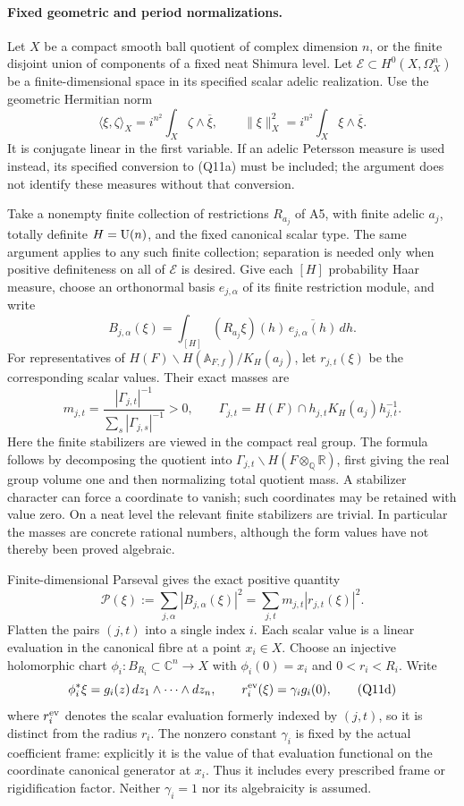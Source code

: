 \documentclass[11pt]{article}
\newcommand{\Q}{\mathbb Q}\newcommand{\C}{\mathbb C}\newcommand{\Z}{\mathbb Z}\newcommand{\R}{\mathbb R}\newcommand{\A}{\mathbb A}\newcommand{\OO}{\mathcal O}
\theoremstyle{definition}\newtheorem{definition}[theorem]{Definition}\newtheorem{remark}[theorem]{Remark}
\begin{document}
\paragraph{Fixed geometric and period normalizations.}
Let $X$ be a compact smooth ball quotient of complex dimension
$n$, or the finite disjoint union of components of a fixed neat
Shimura level.  Let $\mathcal E\subset H^0(X,\Omega_X^n)$ be a
finite-dimensional space in its specified scalar adelic
realization.  Use the geometric Hermitian norm
\[
 \langle\xi,\zeta\rangle_X
       =i^{n^2}\int_X\zeta\wedge\overline\xi,
 \qquad \|\xi\|_X^2=i^{n^2}\int_X\xi\wedge\overline\xi.
 \tag{Q11a}
\]
It is conjugate linear in the first variable.  If an adelic
Petersson measure is used instead, its specified conversion to
(Q11a) must be included; the argument does not identify these
measures without that conversion.

Take a nonempty finite collection of restrictions $R_{a_j}$ of A5, with finite adelic
$a_j$, totally definite $H=\operatorname{U}(n)$, and the fixed canonical
scalar type.  The same argument applies to any such finite
collection; separation is needed only when positive definiteness
on all of $\mathcal E$ is desired.  Give each $[H]$ probability
Haar measure, choose an orthonormal basis $e_{j,\alpha}$ of its
finite restriction module, and write
\[
 B_{j,\alpha}(\xi)
     =\int_{[H]}(R_{a_j}\xi)(h)\,
                              \overline{e_{j,\alpha}(h)}\,dh .
\]
For representatives of
$H(F)\backslash H(\A_{F,f})/K_H(a_j)$, let $r_{j,t}(\xi)$
be the corresponding scalar values.  Their exact masses are
\[
 m_{j,t}=
    \frac{|\Gamma_{j,t}|^{-1}}
         {\displaystyle\sum_s|\Gamma_{j,s}|^{-1}}>0,
 \qquad
 \Gamma_{j,t}=H(F)\cap h_{j,t}K_H(a_j)h_{j,t}^{-1}.
 \tag{Q11b}
\]
Here the finite stabilizers are viewed in the compact real
group.  The formula follows by decomposing the quotient into
$\Gamma_{j,t}\backslash H(F\otimes_\Q\R)$, first giving the
real group volume one and then normalizing total quotient mass.
A stabilizer character can force a coordinate to vanish; such
coordinates may be retained with value zero.  On a neat level
the relevant finite stabilizers are trivial.  In particular the
masses are concrete rational numbers, although the form values
have not thereby been proved algebraic.

Finite-dimensional Parseval gives the exact positive quantity
\[
 \mathcal P(\xi):=\sum_{j,\alpha}|B_{j,\alpha}(\xi)|^2
          =\sum_{j,t}m_{j,t}|r_{j,t}(\xi)|^2.
 \tag{Q11c}
\]
Flatten the pairs $(j,t)$ into a single index $i$.  Each scalar
value is a linear evaluation in the canonical fibre at a point
$x_i\in X$.  Choose an injective holomorphic chart
$\phi_i:B_{R_i}\subset\C^n\longrightarrow X$ with
$\phi_i(0)=x_i$ and $0<r_i<R_i$.  Write
\[
 \phi_i^*\xi=g_i(z)\,dz_1\wedge\cdots\wedge dz_n,
 \qquad r_i^{\rm ev}(\xi)=\gamma_i g_i(0),
 \tag{Q11d}
\]
where $r_i^{\rm ev}$ denotes the scalar evaluation formerly
indexed by $(j,t)$, so it is distinct from the radius $r_i$.
The nonzero constant $\gamma_i$ is fixed by the actual
coefficient frame: explicitly it is the value of that
evaluation functional on the coordinate canonical generator
at $x_i$.  Thus it includes every prescribed frame or
rigidification factor.  Neither $\gamma_i=1$ nor its
algebraicity is assumed.
\end{document}
